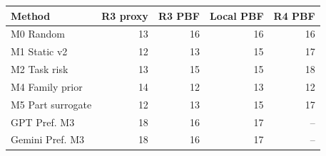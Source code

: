 \begin{tabular}{lrrrr}
\toprule
Method & R3 proxy & R3 PBF & Local PBF & R4 PBF \\
\midrule
M0 Random & 13 & 16 & 16 & 16 \\
M1 Static v2 & 12 & 13 & 15 & 17 \\
M2 Task risk & 13 & 15 & 15 & 18 \\
M4 Family prior & 14 & 12 & 13 & 12 \\
M5 Part surrogate & 12 & 13 & 15 & 17 \\
GPT Pref. M3 & 18 & 16 & 17 & -- \\
Gemini Pref. M3 & 18 & 16 & 17 & -- \\
\bottomrule
\end{tabular}
